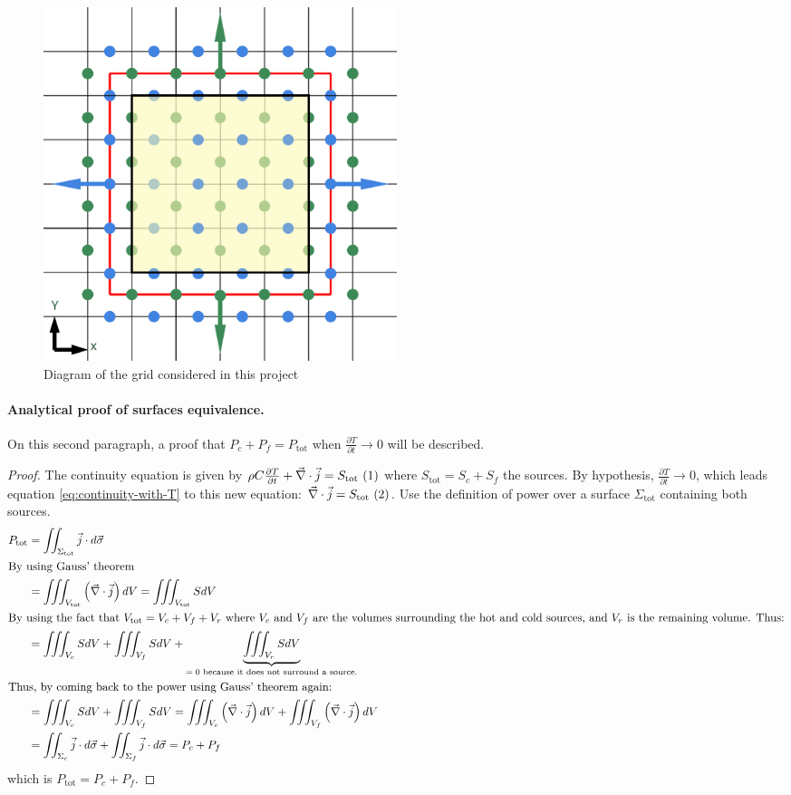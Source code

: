 \documentclass[a4paper,12pt,twoside]{article}
\newcommand{\illabel}[1]{ ~ \refstepcounter{equation}(\theequation)\label{#1}} %
\begin{document}
\begin{figure}[h]
  \centering
  \includegraphics[width=0.5\textwidth]{graphs/d_mailles.eps}
  \caption{Diagram of the grid considered in this project}
  \label{fig:d-mailles}
\end{figure}

\paragraph{Analytical proof of surfaces equivalence.}
On this second paragraph, a proof that $P_c + P_f = P_\text{tot}$ when $\frac{\partial T}{\partial t}\rightarrow 0$ will be described.

\begin{proof}
  The continuity equation is given by $\rho C\frac{\partial T}{\partial t} + \vec{\nabla}\cdot\vec{j} = S_\text{tot} \illabel{eq:continuity-with-T}$ where $S_\text{tot} = S_c + S_f$ the sources.
  By hypothesis, $\frac{\partial T}{\partial t}\rightarrow 0$, which leads equation \eqref{eq:continuity-with-T} to this new equation: $\vec{\nabla}\cdot\vec{j} = S_\text{tot} \illabel{eq:continuity-without-T}$.
  Use the definition of power over a surface $\Sigma_\text{tot}$ containing both sources.
  \begin{align}
    P_\text{tot} &= \iint_{\Sigma_\text{tot}}\vec{j}\cdot d\vec{\sigma} \\
    \intertext{By using Gauss' theorem}
    &= \iiint_{V_\text{tot}}\left(\vec{\nabla}\cdot\vec{j}\right)dV  = \iiint_{V_\text{tot}}SdV \\
    \intertext{By using the fact that $V_\text{tot} = V_c + V_f + V_r$ where $V_c$ and $V_f$ are the volumes surrounding the hot and cold sources, and $V_r$ is the remaining volume. Thus:}
    &= \iiint_{V_c}SdV + \iiint_{V_f}SdV + \underbrace{\iiint_{V_r}SdV}_\text{$=0$ because it does not surround a source.} \\
    \intertext{Thus, by coming back to the power using Gauss' theorem again:}
    &= \iiint_{V_c}SdV + \iiint_{V_f}SdV = \iiint_{V_c}\left(\vec{\nabla}\cdot\vec{j}\right)dV + \iiint_{V_f}\left(\vec{\nabla}\cdot\vec{j}\right)dV \\
    &= \iint_{\Sigma_c}\vec{j}\cdot d\vec{\sigma} + \iint_{\Sigma_f}\vec{j}\cdot d\vec{\sigma} = P_c + P_f
  \end{align}
  which is $P_\text{tot} = P_c + P_f$.
\end{proof}
\end{document}
